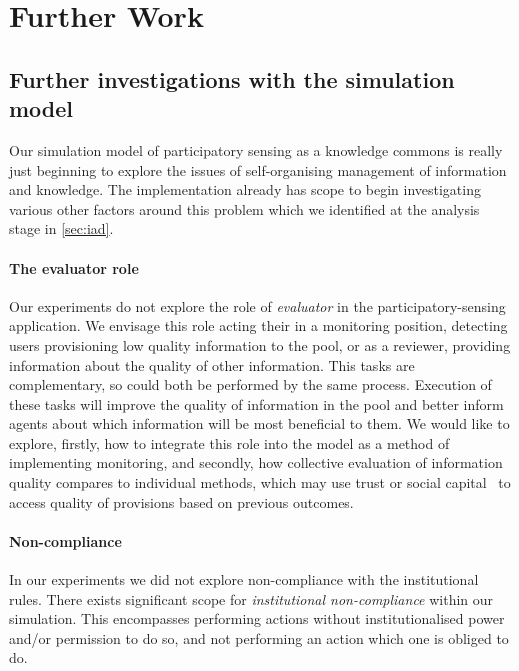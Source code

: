 \section{Further Work}


\subsection{Further investigations with the simulation model}

Our simulation model of participatory sensing as a knowledge commons is really
just beginning to explore the issues of self-organising management of
information and knowledge. The implementation already has scope to begin
investigating various other factors around this problem which we identified at
the analysis stage in \autoref{sec:iad}.


\paragraph{The evaluator role} Our experiments do not explore the role of
\emph{evaluator} in the participatory-sensing application. We envisage this
role acting their in a monitoring position, detecting users provisioning low
quality information to the pool, or as a reviewer, providing information about
the quality of other information. This tasks are complementary, so could both
be performed by the same process. Execution of these tasks will improve the
quality of information in the pool and better inform agents about which
information will be most beneficial to them. We would like to explore,
firstly, how to integrate this role into the model as a method of implementing
monitoring, and secondly, how collective evaluation of information quality
compares to individual methods, which may use trust or social
capital~\citep{Petruzzi2014} to access quality of provisions based on previous
outcomes.

\paragraph{Non-compliance} 
In our experiments we did not explore non-compliance with the institutional rules.
There exists significant scope for \emph{institutional non-compliance} within our
simulation. This encompasses performing actions without institutionalised
power and/or permission to do so, and not performing an action which one is
obliged to do.

